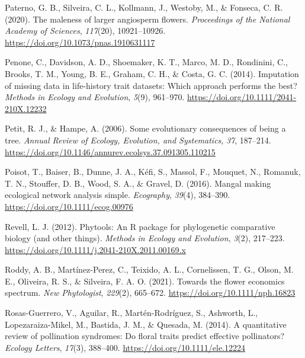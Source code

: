 \documentclass[
  12pt,
  a4paper,
]{article}
\newlength{\cslhangindent}
\newlength{\cslentryspacingunit} %
\newenvironment{CSLReferences}[2] %
 {%
  \setlength{\parindent}{0pt}
  \ifodd #1
  \let\oldpar\par
  \def\par{\hangindent=\cslhangindent\oldpar}
  \fi
  \setlength{\parskip}{#2\cslentryspacingunit}
 }%
 {}
\begin{document}
\begin{CSLReferences}{1}{0}
\leavevmode{}%
Paterno, G. B., Silveira, C. L., Kollmann, J., Westoby, M., \& Fonseca, C. R. (2020). The maleness of larger angiosperm flowers. \emph{Proceedings of the National Academy of Sciences}, \emph{117}(20), 10921--10926. \url{https://doi.org/10.1073/pnas.1910631117}

\leavevmode{}%
Penone, C., Davidson, A. D., Shoemaker, K. T., Marco, M. D., Rondinini, C., Brooks, T. M., Young, B. E., Graham, C. H., \& Costa, G. C. (2014). Imputation of missing data in life-history trait datasets: Which approach performs the best? \emph{Methods in Ecology and Evolution}, \emph{5}(9), 961--970. \url{https://doi.org/10.1111/2041-210X.12232}

\leavevmode{}%
Petit, R. J., \& Hampe, A. (2006). Some evolutionary consequences of being a tree. \emph{Annual Review of Ecology, Evolution, and Systematics}, \emph{37}, 187--214. \url{https://doi.org/10.1146/annurev.ecolsys.37.091305.110215}

\leavevmode{}%
Poisot, T., Baiser, B., Dunne, J. A., Kéfi, S., Massol, F., Mouquet, N., Romanuk, T. N., Stouffer, D. B., Wood, S. A., \& Gravel, D. (2016). Mangal \textendash{} making ecological network analysis simple. \emph{Ecography}, \emph{39}(4), 384--390. \url{https://doi.org/10.1111/ecog.00976}

\leavevmode{}%
Revell, L. J. (2012). Phytools: An {R} package for phylogenetic comparative biology (and other things). \emph{Methods in Ecology and Evolution}, \emph{3}(2), 217--223. \url{https://doi.org/10.1111/j.2041-210X.2011.00169.x}

\leavevmode{}%
Roddy, A. B., Martínez-Perez, C., Teixido, A. L., Cornelissen, T. G., Olson, M. E., Oliveira, R. S., \& Silveira, F. A. O. (2021). Towards the flower economics spectrum. \emph{New Phytologist}, \emph{229}(2), 665--672. \url{https://doi.org/10.1111/nph.16823}

\leavevmode{}%
Rosas-Guerrero, V., Aguilar, R., Martén-Rodríguez, S., Ashworth, L., Lopezaraiza-Mikel, M., Bastida, J. M., \& Quesada, M. (2014). A quantitative review of pollination syndromes: Do floral traits predict effective pollinators? \emph{Ecology Letters}, \emph{17}(3), 388--400. \url{https://doi.org/10.1111/ele.12224}


\end{CSLReferences}
\end{document}
